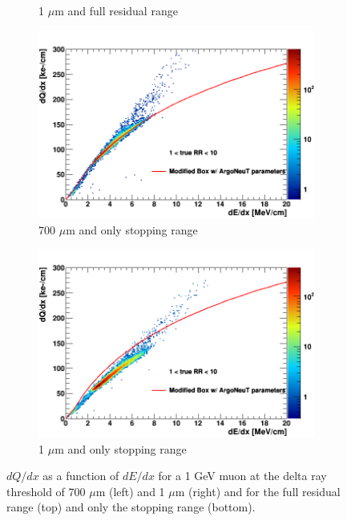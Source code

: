 \begin{figure}[b!]
\begin{subfigure}[b]{0.495\textwidth}
            \caption{1 $\mu$m and full residual range}%
            \label{fig:mu_2d_1}
        \end{subfigure}
        \begin{subfigure}[b]{0.495\textwidth}   
            \centering 
            \includegraphics[width=\textwidth]{mu_700um_lowRR}
            \caption{700 $\mu$m and only stopping range}%
            \label{fig:mu_2d_700_lowRR}
        \end{subfigure}
        \hfill
        \begin{subfigure}[b]{0.495\textwidth}   
            \centering 
            \includegraphics[width=\textwidth]{mu_1um_lowRR}
            \caption{1 $\mu$m and only stopping range}%
            \label{fig:mu_2d_1_lowRR}
        \end{subfigure}
	\caption[Charge to Energy Loss Conversion of a 1 GeV Muon]{
        	$dQ/dx$ as a function of $dE/dx$ for a 1 GeV muon at the delta ray threshold of 700 $\mu$m (left) and 1 $\mu$m (right) and for the full residual range (top) and only the stopping range (bottom).
	}
        \label{fig:muon_2d}
\end{figure}

